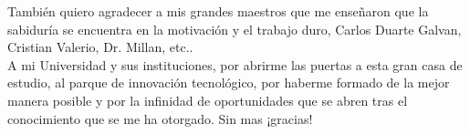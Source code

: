 
\begin{acknowledgements}

También quiero agradecer a mis grandes maestros que me enseñaron que la sabiduría se encuentra en la motivación y el trabajo duro, Carlos Duarte Galvan, Cristian Valerio, Dr. Millan, etc..\\
A mi Universidad y sus instituciones, por abrirme las puertas a esta gran casa de estudio, al parque de innovación tecnológico, por haberme formado de la mejor manera posible y por la infinidad de oportunidades que se abren tras el conocimiento que se me ha otorgado. Sin mas ¡gracias!
\end{acknowledgements}




